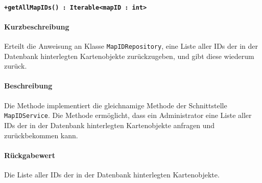 \paragraph*{\texttt{+getAllMapIDs() : Iterable<mapID : int>}}%
\paragraph*{Kurzbeschreibung}
Erteilt die Anweisung an Klasse \texttt{MapIDRepository}, eine Liste aller IDs der in der Datenbank hinterlegten Kartenobjekte zurückzugeben, und gibt diese wiederum zurück.
\paragraph*{Beschreibung}
Die Methode implementiert die gleichnamige Methode der Schnittstelle \texttt{MapIDService}.
Die Methode ermöglicht, dass ein Administrator eine Liste aller IDs der in der Datenbank hinterlegten Kartenobjekte anfragen und zurückbekommen kann.
\paragraph*{Rückgabewert}
Die Liste aller IDs der in der Datenbank hinterlegten Kartenobjekte.
